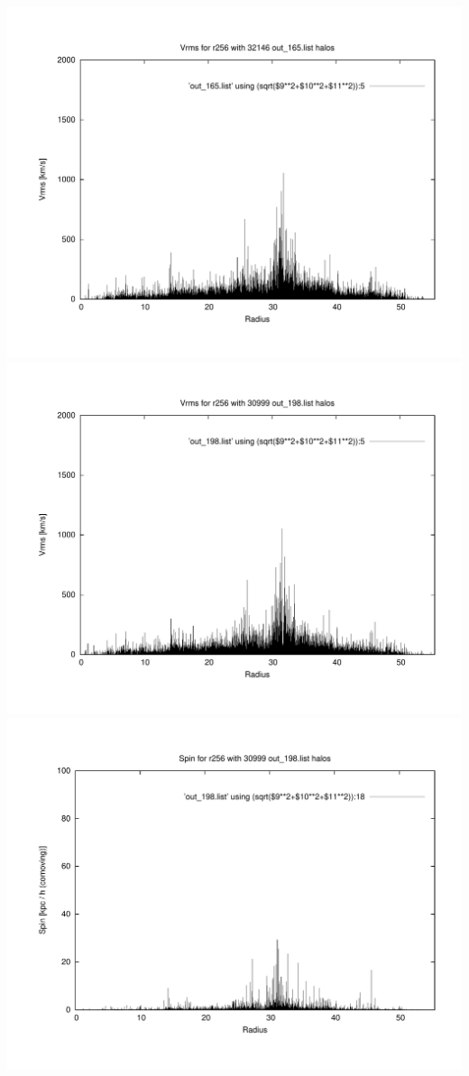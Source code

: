 \includegraphics[scale=0.3]{r256/h100/stages14_ling/plot_Vrms_out_165.pdf}
\includegraphics[scale=0.3]{r256/h100/stages14_ling/plot_Vrms_out_198.pdf}
\includegraphics[scale=0.3]{r256/h100/stages14_ling/plot_spin_out_198.pdf}


